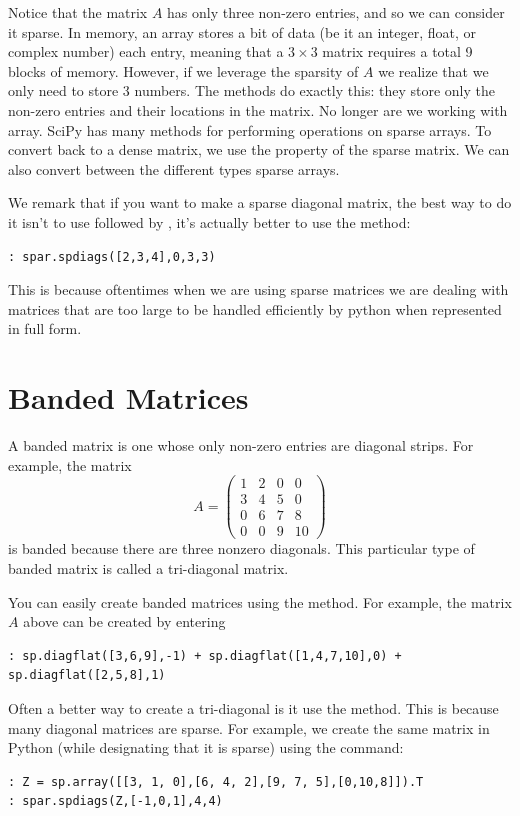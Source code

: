 Notice that the matrix $A$ has only three non-zero entries, and so we can consider it sparse. In memory, an array stores a bit of data (be it an integer, float, or complex number) each entry, meaning that a $3 \times 3$ matrix requires a total 9 blocks of memory. However, if we leverage the sparsity of $A$ we realize that we only need to store 3 numbers. The  methods do exactly this: they store only the non-zero entries and their locations in the matrix. No longer are we working with array.  SciPy has many methods for performing operations on sparse arrays.  To convert back to a dense matrix, we use the  property of the sparse matrix.  We can also convert between the different types sparse arrays.

We remark that if you want to make a sparse diagonal matrix, the
best way to do it isn't to use  followed by ,
it's actually better to use the  method:
\begin{lstlisting}
: spar.spdiags([2,3,4],0,3,3)
\end{lstlisting}

This is because oftentimes when we are using sparse matrices we are dealing with matrices that are too large to be handled efficiently by python when represented in full form.

\section*{Banded Matrices}
A banded matrix is one whose only non-zero entries are diagonal
strips.  For example, the matrix
\[
A = \begin{pmatrix} 1&2&0&0\\3&4&5&0\\0&6&7&8\\0&0&9&10
\end{pmatrix}
\]
is banded because there are three nonzero diagonals.  This
particular type of banded matrix is called a tri-diagonal matrix.

You can easily create banded matrices using the  method.  For example, the matrix $A$ above can be created by
entering
\begin{lstlisting}
: sp.diagflat([3,6,9],-1) + sp.diagflat([1,4,7,10],0) + sp.diagflat([2,5,8],1)
\end{lstlisting}

Often a better way to create a tri-diagonal is it use the  method. This is because many diagonal matrices are sparse. For example, we create the same matrix in Python (while designating that it is sparse) using the command:
\begin{lstlisting}
: Z = sp.array([[3, 1, 0],[6, 4, 2],[9, 7, 5],[0,10,8]]).T
: spar.spdiags(Z,[-1,0,1],4,4)
\end{lstlisting}

